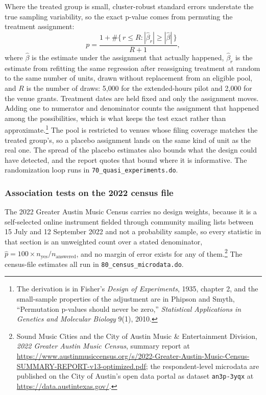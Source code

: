 Where the treated group is small, cluster-robust standard errors understate
the true sampling variability, so the exact p-value comes from permuting
the treatment assignment:
\[
p = \frac{1 + \#\{\,r \le R : |\hat\beta_r| \ge |\hat\beta|\,\}}{R + 1},
\]
where \(\hat\beta\) is the estimate under the assignment that actually
happened, \(\hat\beta_r\) is the estimate from refitting the same
regression after reassigning treatment at random to the same number of
units, drawn without replacement from an eligible pool, and \(R\) is the
number of draws: 5{,}000 for the extended-hours pilot and 2{,}000 for the
venue grants. Treatment dates are held fixed and only the assignment moves.
Adding one to numerator and denominator counts the assignment that happened
among the possibilities, which is what keeps the test exact rather than
approximate.\footnote{The derivation is in Fisher's \emph{Design of
Experiments}, 1935, chapter 2, and the small-sample properties of the
adjustment are in Phipson and Smyth, ``Permutation p-values should never be
zero,'' \emph{Statistical Applications in Genetics and Molecular Biology}
9(1), 2010.} The pool is restricted to venues whose filing coverage matches
the treated group's, so a placebo assignment lands on the same kind of unit
as the real one. The spread of the placebo estimates also bounds what the
design could have detected, and the report quotes that bound where it is
informative. The randomization loop runs in
\texttt{70\_quasi\_experiments.do}.

\subsubsection*{Association tests on the 2022 census file}

The 2022 Greater Austin Music Census carries no design weights, because it
is a self-selected online instrument fielded through community mailing
lists between 15 July and 12 September 2022 and not a probability sample,
so every statistic in that section is an unweighted count over a stated
denominator, \(\hat p = 100 \times n_{\mathrm{yes}}/n_{\mathrm{answered}}\),
and no margin of error exists for any of them.\footnote{Sound Music Cities
and the City of Austin Music \& Entertainment Division, \emph{2022 Greater
Austin Music Census}, summary report at
\url{https://www.austinmusiccensus.org/s/2022-Greater-Austin-Music-Census-SUMMARY-REPORT-v13-optimized.pdf};
the respondent-level microdata are published on the City of Austin's open
data portal as dataset \texttt{an3p-3yqx} at \url{https://data.austintexas.gov/}.} The
census-file estimates all run in \texttt{80\_census\_microdata.do}.

